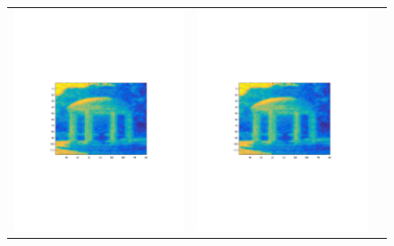 \documentclass{article}
\begin{document}
\begin{figure}
\begin{tabular}{ccc}
\includegraphics[scale=0.25]{mean.pdf}

&

\includegraphics[scale=0.25]{afterb.pdf}


\end{tabular}
\end{figure}
\end{document}
